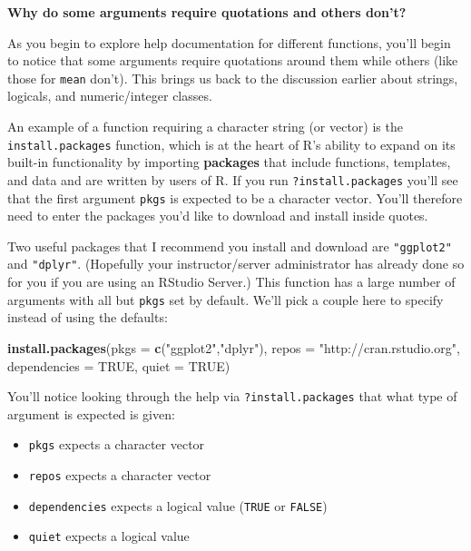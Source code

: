 \documentclass[]{tufte-book}
\newenvironment{Shaded}{\begin{snugshade}}{\end{snugshade}}
\newcommand{\KeywordTok}[1]{\textcolor[rgb]{0.13,0.29,0.53}{\textbf{{#1}}}}
\newcommand{\DataTypeTok}[1]{\textcolor[rgb]{0.13,0.29,0.53}{{#1}}}
\newcommand{\StringTok}[1]{\textcolor[rgb]{0.31,0.60,0.02}{{#1}}}
\newcommand{\OtherTok}[1]{\textcolor[rgb]{0.56,0.35,0.01}{{#1}}}
\newcommand{\NormalTok}[1]{{#1}}
\providecommand{\tightlist}{%
  \setlength{\itemsep}{0pt}\setlength{\parskip}{0pt}}
\theoremstyle{definition}
\theoremstyle{definition}
\theoremstyle{remark}
\begin{document}
\vspace*{0.2in}

\noindent\textbf{Why do some arguments require quotations and others don't?}\vspace*{0.1in}

As you begin to explore help documentation for different functions,
you'll begin to notice that some arguments require quotations around
them while others (like those for \texttt{mean} don't). This brings us
back to the discussion earlier about strings, logicals, and
numeric/integer classes.

An example of a function requiring a character string (or vector) is the
\texttt{install.packages} function, which is at the heart of R's ability
to expand on its built-in functionality by importing \textbf{packages}
that include functions, templates, and data and are written by users of
R. If you run \texttt{?install.packages} you'll see that the first
argument \texttt{pkgs} is expected to be a character vector. You'll
therefore need to enter the packages you'd like to download and install
inside quotes.

Two useful packages that I recommend you install and download are
\texttt{"ggplot2"} and \texttt{"dplyr"}. (Hopefully your
instructor/server administrator has already done so for you if you are
using an RStudio Server.) This function has a large number of arguments
with all but \texttt{pkgs} set by default. We'll pick a couple here to
specify instead of using the defaults:

\begin{Shaded}
\begin{Highlighting}[]
\KeywordTok{install.packages}\NormalTok{(}\DataTypeTok{pkgs =} \KeywordTok{c}\NormalTok{(}\StringTok{"ggplot2"}\NormalTok{,}\StringTok{"dplyr"}\NormalTok{),}
                 \DataTypeTok{repos =} \StringTok{"http://cran.rstudio.org"}\NormalTok{,}
                 \DataTypeTok{dependencies =} \OtherTok{TRUE}\NormalTok{,}
                 \DataTypeTok{quiet =} \OtherTok{TRUE}\NormalTok{)}
\end{Highlighting}
\end{Shaded}

You'll notice looking through the help via \texttt{?install.packages}
that what type of argument is expected is given:

\begin{itemize}
\tightlist
\item
  \texttt{pkgs} expects a character vector
\item
  \texttt{repos} expects a character vector
\item
  \texttt{dependencies} expects a logical value (\texttt{TRUE} or
  \texttt{FALSE})
\item
  \texttt{quiet} expects a logical value
\end{itemize}
\end{document}

